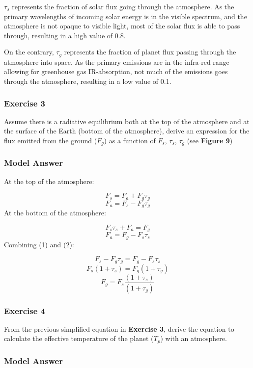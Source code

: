 \documentclass[
  letterpaper,
  DIV=11,
  numbers=noendperiod]{scrartcl}
\begin{document}
\(\tau_s\) represents the fraction of solar flux going through the
atmosphere. As the primary wavelengths of incoming solar energy is in
the visible spectrum, and the atmosphere is not opaque to visible light,
most of the solar flux is able to pass through, resulting in a high
value of 0.8.

On the contrary, \(\tau_g\) represents the fraction of planet flux
passing through the atmosphere into space. As the primary emissions are
in the infra-red range allowing for greenhouse gas IR-absorption, not
much of the emissions goes through the atmosphere, resulting in a low
value of 0.1.

\subsubsection{\texorpdfstring{\textbf{Exercise 3}}{Exercise 3}}

Assume there is a radiative equilibrium both at the top of the
atmosphere and at the surface of the Earth (bottom of the atmosphere),
derive an expression for the flux emitted from the ground (\(F_g\)) as a
function of \(F_s\), \(\tau_s\), \(\tau_g\) (see \textbf{Figure 9})

\subsubsection{\texorpdfstring{\textbf{Model Answer}}{Model Answer}}

At the top of the atmosphere:

\[F_s = F_a + F_g\tau_g\] \[F_a = F_s - F_g\tau_g\] At the bottom of the
atmosphere:

\[F_s\tau_s + F_a = F_g\] \[F_a = F_g - F_s\tau_s\] Combining (1) and
(2):

\[F_s - F_g\tau_g = F_g - F_s\tau_s\] \[F_s(1+\tau_s) = F_g(1+\tau_g)\]
\[F_g = F_s\frac{(1+\tau_s)}{(1+\tau_g)}\]

\subsubsection{\texorpdfstring{\textbf{Exercise 4}}{Exercise 4}}

From the previous simplified equation in \textbf{Exercise 3}, derive the
equation to calculate the effective temperature of the planet (\(T_p\))
with an atmosphere.

\subsubsection{\texorpdfstring{\textbf{Model Answer}}{Model Answer}}
\end{document}
